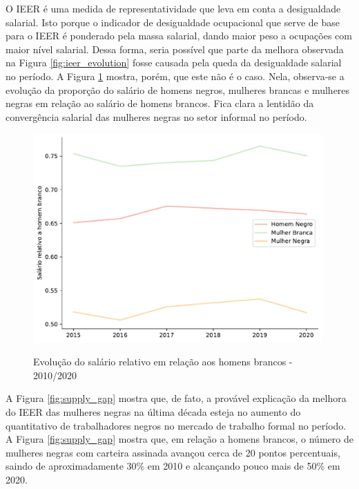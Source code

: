 \documentclass[12pt]{article}
\begin{document}
\par O IEER é uma medida de representatividade que leva em conta a desigualdade salarial. Isto porque o indicador de desigualdade ocupacional que serve de base para o IEER é ponderado pela massa salarial, dando maior peso a ocupações com maior nível salarial. Dessa forma, seria possível que parte da melhora observada na Figura \ref{fig:ieer_evolution} fosse causada pela queda da desigualdade salarial no período. A Figura \ref{fig:wage_gap} mostra, porém, que este não é o caso. Nela, observa-se a evolução da proporção do salário de homens negros, mulheres brancas e mulheres negras em relação ao salário de homens brancos. Fica clara a lentidão da convergência salarial das mulheres negras no setor informal no período.

\begin{figure}[H]
    \centering
    \caption{Evolução do salário relativo em relação aos homens brancos - 2010/2020}
        \includegraphics[height=8cm]{../figures/wage_gap.pdf}
    \label{fig:wage_gap}
\end{figure}

\par A Figura \ref{fig:supply_gap} mostra que, de fato, a provável explicação da melhora do IEER das mulheres negras na última década esteja no aumento do quantitativo de trabalhadores negros no mercado de trabalho formal no período. A Figura \ref{fig:supply_gap} mostra que, em relação a homens brancos, o número de mulheres negras com carteira assinada avançou cerca de 20 pontos percentuais, saindo de aproximadamente 30\% em 2010 e alcançando pouco mais de 50\% em 2020.
\end{document}
